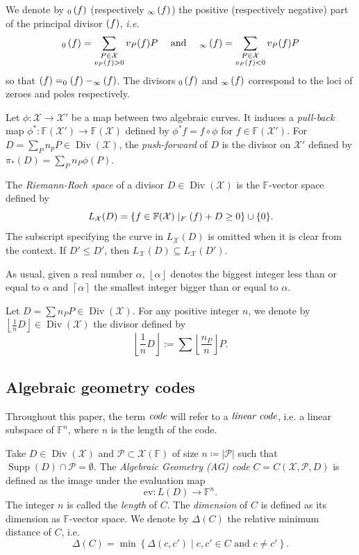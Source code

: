 \documentclass[a4paper,USenglish,autoref]{lipics-v2021}
\newcommand\F{\mathbb{F}}
\newcommand\floor[1]{\left\lfloor #1 \right\rfloor}
\newcommand\ceil[1]{\left\lceil #1 \right\rceil}
\newcommand\poles[1]{\div_\infty\left( #1 \right)}
\newcommand\zeroes[1]{\div_0\left( #1 \right)}
\DeclareMathOperator{\Supp}{Supp}
\DeclareMathOperator{\Div}{Div}
\let\div\relax\DeclareMathOperator{\div}{div}
\newcommand{\set}[1]{\left\{#1\right\}}
\newcommand{\size}[1]{\left|#1\right|}
\newcommand\calX{\mathcal{X}}
\newcommand\calP{\mathcal{P}}
\newcommand\mydef{\coloneqq}
\begin{document}
We denote by $\zeroes{f}$ (respectively $\poles{f}$) the positive (respectively negative) part of the principal divisor $\div(f)$, \textit{i.e.}
\[ \zeroes{f}=\sum_{\substack{P \in \calX\\ v_P(f) >0 }} v_P(f) P \quad \text{  and  } \quad \poles{f}=\sum_{\substack{P \in \calX\\ v_P(f) <0 }} v_P(f) P\]
so that $\div(f)=\zeroes{f} - \poles{f}$. The divisors $\zeroes{f}$ and $\poles{f}$ correspond to the loci of zeroes and poles respectively.

Let $\phi: \calX \rightarrow \calX'$ be a map between two algebraic curves. It induces a \emph{pull-back} map ${\phi^*:\F(\calX') \rightarrow \F(\calX)}$ defined by $\phi^* f =f \circ \phi$ for $f \in \F(\calX')$. For $D=\sum_P n_p P \in \Div(\calX)$, the \emph{push-forward} of $D$ is the divisor on $\calX'$ defined by $\pi_*(D)=\sum_P n_P \phi(P)$.

The \emph{Riemann-Roch space} of a divisor $D \in \Div(\calX)$ is the $\F$-vector space defined by
\[L_\calX(D)=\{f \in \F(\calX) \mid \div_{F}(f) + D \geq 0\}\cup\{0\}.\]
The subscript specifying the curve in $L_\calX(D)$ is omitted when it is clear from the context. If $D' \leq D'$, then $L_\calX(D) \subseteq L_\calX(D')$.

As usual, given a real number $\alpha$, $\floor{\alpha}$ denotes the biggest integer less than or equal to $\alpha$ and $\ceil{\alpha}$ the smallest integer bigger than or equal to $\alpha$.
\begin{definition}\label{def:floor_div}
	Let $D = \sum n_P P \in \Div(\calX)$. For any positive integer $n$, we denote by ${\floor{\frac{1}{n}D}\in \Div(\calX)}$ the divisor defined by 
	\[\floor{\frac{1}{n}D}:=\sum \floor{\frac{n_P}{n}} P.\]
\end{definition}

\subsection{Algebraic geometry codes}
Throughout this paper, the term $\emph{code}$ will refer to a $\emph{linear code}$, i.e. a linear subspace of $\F^n$, where $n$ is the length of the code.

Take $D \in \Div(\calX)$ and $\calP \subset \calX(\F)$ of size $n\mydef\size{\calP}$ such that $\Supp(D) \cap \calP = \emptyset$. The \emph{Algebraic Geometry (AG) code} $C=C(\calX,\calP,D)$ is defined as the image under the evaluation map
\[\text{ev} : L(D) \rightarrow \F^n.\]
The integer $n$ is called the \emph{length} of $C$. The \emph{dimension} of $C$ is defined as its dimension as $\F$-vector space. We denote by $\Delta(C)$ the relative minimum distance of $C$, i.e.
\[\Delta(C) = \min \set{\Delta(c, c') \mid c, c' \in C \text{ and } c \neq c'}.\]
\end{document}

